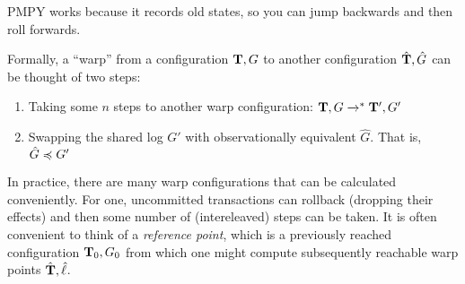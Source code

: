 \vfill
\pagebreak

\bigskip 
\bigskip 
\bigskip 


PMPY works because it records old states, so you can jump backwards
and then roll forwards.


Formally, a ``warp'' from a configuration $\mathbf{T},G$ to another
configuration $\hat{\mathbf{T}},\hat{G}$ can be thought of two steps:
\begin{enumerate}
\item Taking some $n$ steps to another warp configuration:
  $\mathbf{T},G \xrightarrow{}^{*} \mathbf{T}',G'$
\item Swapping the shared log $G'$ with observationally equivalent
  $\hat{G}$. That is,  $\hat{G} \preccurlyeq G'$
\end{enumerate}





In practice, there are many warp configurations that can be calculated
conveniently. For one, uncommitted transactions can rollback (dropping
their effects) and then some number of (intereleaved) steps can be taken.
%
It is often convenient to think of a \emph{reference point}, which is
a previously reached configuration $\mathbf{T}_0,G_0$ from which one might
compute subsequently reachable warp points $\hat{\mathbf{T}},\hat{\ell}$.


    
